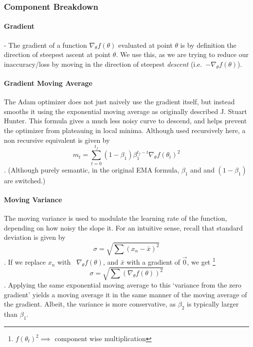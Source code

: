 \documentclass[titlepage,letterpaper]{article}
\begin{document}
\subsubsection{Component Breakdown}



\paragraph{Gradient} - The gradient of a function $\nabla_\theta f(\theta)$ evaluated at point $\theta$ is by definition the direction of steepest ascent at point $\theta$. We use this, as we are trying to reduce our inaccuracy/loss by moving in the direction of steepest \textit{descent} \mbox{(i.e. $-\nabla_\theta f(\theta)$)}. \cite{gradient} 

\paragraph{Gradient Moving Average}
The Adam optimizer does not just naively use the gradient itself, but instead smooths it using the exponential moving average as originally described J. Stuart Hunter.\cite{EMA} This formula gives a much less noisy curve to descend, and helps prevent the optimizer from plateauing in local minima. Although used recursively here, a non recursive equivalent is given by
\[m_t = \sum_{t=0}^{t_f} \left(1-\beta_1\right) \beta_1^{t_f-t}\nabla_\theta f\left(\theta_{t}\right)^2\].
(Although purely semantic, in the original EMA formula, \(\beta_1\) and and \(\left(1-\beta_1\right)\) are switched.)

\paragraph{Moving Variance}
The moving variance is used to modulate the learning rate of the function, depending on how noisy the slope it. For an intuitive sense, 
recall that standard deviation is given by
\[\sigma = \sqrt{\sum \left(x_n - \bar{x}\right)^2}\].
If we replace \(x_n\) with \ \(\nabla_\theta f(\theta)\), and \(\bar{x}\) with a gradient of \(\vec{0}\), we get \footnote{\(f\left(\theta_{t}\right)^2 \implies \) component wise multiplication}
\[\sigma = \sqrt{\sum \left(\nabla_\theta f(\theta)\right)^2}\].
Applying the same exponential moving average to this `variance from the zero gradient' yields a moving average it in the same manner of the moving average of the gradient. Albeit, the variance is more conservative, as \(\beta_2\) is typically larger than \(\beta_1\)\cite{adam}.
\end{document}
